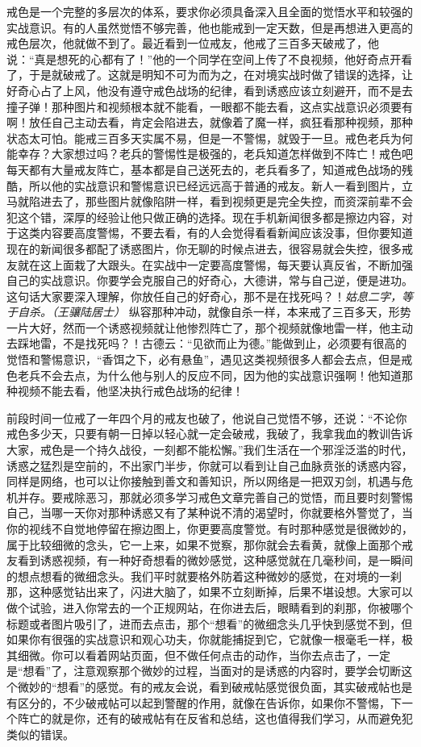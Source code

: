 戒色是一个完整的多层次的体系，要求你必须具备深入且全面的觉悟水平和较强的实战意识。有的人虽然觉悟不够完善，他也能戒到一定天数，但是再想进入更高的戒色层次，他就做不到了。最近看到一位戒友，他戒了三百多天破戒了，他说：“真是想死的心都有了！”他的一个同学在空间上传了不良视频，他好奇点开看了，于是就破戒了。这就是明知不可为而为之，在对境实战时做了错误的选择，让好奇心占了上风，他没有遵守戒色战场的纪律，看到诱惑应该立刻避开，而不是去撞子弹！那种图片和视频根本就不能看，一眼都不能去看，这点实战意识必须要有啊！放任自己主动去看，肯定会陷进去，就像着了魔一样，疯狂看那种视频，那种状态太可怕。能戒三百多天实属不易，但是一不警惕，就毁于一旦。戒色老兵为何能幸存？大家想过吗？老兵的警惕性是极强的，老兵知道怎样做到不阵亡！戒色吧每天都有大量戒友阵亡，基本都是自己送死去的，老兵看多了，知道戒色战场的残酷，所以他的实战意识和警惕意识已经远远高于普通的戒友。新人一看到图片，立马就陷进去了，那些图片就像陷阱一样，看到视频更是完全失控，而资深前辈不会犯这个错，深厚的经验让他只做正确的选择。现在手机新闻很多都是擦边内容，对于这类内容要高度警惕，不要去看，有的人会觉得看看新闻应该没事，但你要知道现在的新闻很多都配了诱惑图片，你无聊的时候点进去，很容易就会失控，很多戒友就在这上面栽了大跟头。在实战中一定要高度警惕，每天要认真反省，不断加强自己的实战意识。你要学会克服自己的好奇心，大德讲，常与自己逆，便是进功。这句话大家要深入理解，你放任自己的好奇心，那不是在找死吗？！\textit{姑息二字，等于自杀。（王骧陆居士）} 纵容那种冲动，就像自杀一样，本来戒了三百多天，形势一片大好，然而一个诱惑视频就让他惨烈阵亡了，那个视频就像地雷一样，他主动去踩地雷，不是找死吗？！古德云：“见欲而止为德。”能做到止，必须要有很高的觉悟和警惕意识，“香饵之下，必有悬鱼”，遇见这类视频很多人都会去点，但是戒色老兵不会去点，为什么他与别人的反应不同，因为他的实战意识强啊！他知道那种视频不能去看，他坚决执行戒色战场的纪律！

前段时间一位戒了一年四个月的戒友也破了，他说自己觉悟不够，还说：“不论你戒色多少天，只要有朝一日掉以轻心就一定会破戒，我破了，我拿我血的教训告诉大家，戒色是一个持久战役，一刻都不能松懈。”我们生活在一个邪淫泛滥的时代，诱惑之猛烈是空前的，不出家门半步，你就可以看到让自己血脉贲张的诱惑内容，同样是网络，也可以让你接触到善文和善知识，所以网络是一把双刃剑，机遇与危机并存。要戒除恶习，那就必须多学习戒色文章完善自己的觉悟，而且要时刻警惕自己，当哪一天你对那种诱惑又有了某种说不清的渴望时，你就要格外警觉了，当你的视线不自觉地停留在擦边图上，你更要高度警觉。有时那种感觉是很微妙的，属于比较细微的念头，它一上来，如果不觉察，那你就会去看黄，就像上面那个戒友看到诱惑视频，有一种好奇想看的微妙感觉，这种感觉就在几毫秒间，是一瞬间的想点想看的微细念头。我们平时就要格外防着这种微妙的感觉，在对境的一刹那，这种感觉钻出来了，闪进大脑了，如果不立刻断掉，后果不堪设想。大家可以做个试验，进入你常去的一个正规网站，在你进去后，眼睛看到的刹那，你被哪个标题或者图片吸引了，进而去点击，那个“想看”的微细念头几乎快到感觉不到，但如果你有很强的实战意识和观心功夫，你就能捕捉到它，它就像一根毫毛一样，极其细微。你可以看着网站页面，但不做任何点击的动作，当你去点击了，一定是“想看”了，注意观察那个微妙的过程，当面对的是诱惑的内容时，要学会切断这个微妙的“想看”的感觉。有的戒友会说，看到破戒帖感觉很负面，其实破戒帖也是有区分的，不少破戒帖可以起到警醒的作用，就像在告诉你，如果你不警惕，下一个阵亡的就是你，还有的破戒帖有在反省和总结，这也值得我们学习，从而避免犯类似的错误。

